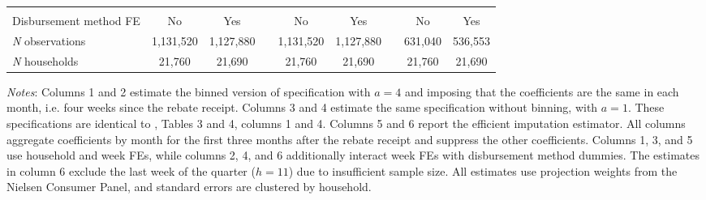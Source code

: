 \documentclass[english,11pt]{article}
\providecommand{\tabularnewline}{\\}
\theoremstyle{plain}
\theoremstyle{plain}
\theoremstyle{plain}
\theoremstyle{plain}
\let\ref\Cref
\begin{document}
\begin{table}
\begin{centering}
\begin{tabular}{lcccccccc}
 &  &  &  &  &  &  &  & \tabularnewline
{\footnotesize{}Disbursement method FE} & {\footnotesize{}No} & {\footnotesize{}Yes} &  & {\footnotesize{}No} & {\footnotesize{}Yes} &  & {\footnotesize{}No} & {\footnotesize{}Yes}\tabularnewline
\emph{\footnotesize{}N}{\footnotesize{} observations} & {\footnotesize{}1,131,520} & {\footnotesize{}1,127,880} &  & {\footnotesize{}1,131,520} & {\footnotesize{}1,127,880} &  & {\footnotesize{}631,040} & {\footnotesize{}536,553}\tabularnewline
\emph{\footnotesize{}N}{\footnotesize{} households} & {\footnotesize{}21,760} & {\footnotesize{}21,690} &  & {\footnotesize{}21,760} & {\footnotesize{}21,690} &  & {\footnotesize{}21,760} & {\footnotesize{}21,690}\tabularnewline
\bottomrule
\end{tabular}{\small\par}
\par\end{centering}
\medskip{}

\emph{\footnotesize{}Notes}{\footnotesize{}: Columns 1 and 2 estimate
the binned version of specification \ref{eq:BP_spec} with $a=4$
and imposing that the coefficients are the same in each month, i.e.
four weeks since the rebate receipt. Columns 3 and 4 estimate the
same specification without binning, with $a=1$. These specifications
are identical to \textcite{Broda2014}, Tables 3 and 4, columns 1
and 4. Columns 5 and 6 report the efficient imputation estimator.
All columns aggregate coefficients by month for the first three months
after the rebate receipt and suppress the other coefficients. Columns
1, 3, and 5 use household and week FEs, while columns 2, 4, and 6
additionally interact week FEs with disbursement method dummies. The
estimates in column 6 exclude the last week of the quarter ($h=11$)
due to insufficient sample size. All estimates use projection weights
from the Nielsen Consumer Panel, and standard errors are clustered
by household.}{\footnotesize\par}
\end{table}
\end{document}
